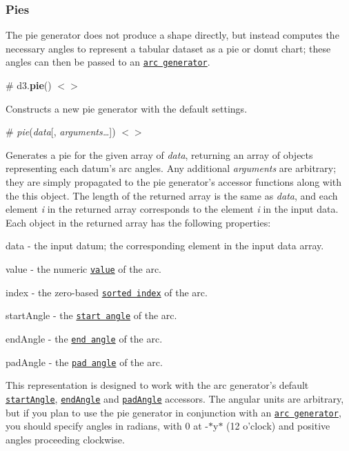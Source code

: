 \subsubsection*{Pies}

The pie generator does not produce a shape directly, but instead computes the necessary angles to represent a tabular dataset as a pie or donut chart; these angles can then be passed to an \href{#arcs}{\tt arc generator}.

\label{_pie}%
\# d3.{\bfseries pie}() \href{https://github.com/d3/d3-shape/blob/master/src/pie.js}{\tt $<$$>$}

Constructs a new pie generator with the default settings.

\label{__pie}%
\# {\itshape pie}({\itshape data}\mbox{[}, {\itshape arguments…}\mbox{]}) \href{https://github.com/d3/d3-shape/blob/master/src/pie.js#L14}{\tt $<$$>$}

Generates a pie for the given array of {\itshape data}, returning an array of objects representing each datum’s arc angles. Any additional {\itshape arguments} are arbitrary; they are simply propagated to the pie generator’s accessor functions along with the {\ttfamily this} object. The length of the returned array is the same as {\itshape data}, and each element {\itshape i} in the returned array corresponds to the element {\itshape i} in the input data. Each object in the returned array has the following properties\+:


\begin{DoxyItemize}
\item {\ttfamily data} -\/ the input datum; the corresponding element in the input data array.
\item {\ttfamily value} -\/ the numeric \href{#pie_value}{\tt value} of the arc.
\item {\ttfamily index} -\/ the zero-\/based \href{#pie_sort}{\tt sorted index} of the arc.
\item {\ttfamily start\+Angle} -\/ the \href{#pie_startAngle}{\tt start angle} of the arc.
\item {\ttfamily end\+Angle} -\/ the \href{#pie_endAngle}{\tt end angle} of the arc.
\item {\ttfamily pad\+Angle} -\/ the \href{#pie_padAngle}{\tt pad angle} of the arc.
\end{DoxyItemize}

This representation is designed to work with the arc generator’s default \href{#arc_startAngle}{\tt start\+Angle}, \href{#arc_endAngle}{\tt end\+Angle} and \href{#arc_padAngle}{\tt pad\+Angle} accessors. The angular units are arbitrary, but if you plan to use the pie generator in conjunction with an \href{#arcs}{\tt arc generator}, you should specify angles in radians, with 0 at -\/$\ast$y$\ast$ (12 o’clock) and positive angles proceeding clockwise.

